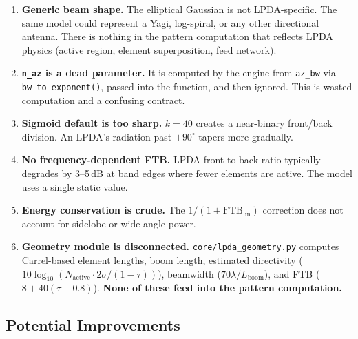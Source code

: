 \documentclass[11pt,a4paper]{article}
\begin{document}
\begin{enumerate}[nosep]
    \item \textbf{Generic beam shape.} The elliptical Gaussian is not LPDA-specific. The same model could represent a Yagi, log-spiral, or any other directional antenna. There is nothing in the pattern computation that reflects LPDA physics (active region, element superposition, feed network).
    \item \textbf{\texttt{n\_az} is a dead parameter.} It is computed by the engine from \texttt{az\_bw} via \texttt{bw\_to\_exponent()}, passed into the function, and then ignored. This is wasted computation and a confusing contract.
    \item \textbf{Sigmoid default is too sharp.} $k = 40$ creates a near-binary front/back division. An LPDA's radiation past $\pm 90^\circ$ tapers more gradually.
    \item \textbf{No frequency-dependent FTB.} LPDA front-to-back ratio typically degrades by 3--5\,dB at band edges where fewer elements are active. The model uses a single static value.
    \item \textbf{Energy conservation is crude.} The $1/(1 + \text{FTB}_\text{lin})$ correction does not account for sidelobe or wide-angle power.
    \item \textbf{Geometry module is disconnected.} \texttt{core/lpda\_geometry.py} computes Carrel-based element lengths, boom length, estimated directivity ($10 \log_{10}(N_\text{active} \cdot 2\sigma / (1-\tau))$), beamwidth ($70\lambda / L_\text{boom}$), and FTB ($8 + 40(\tau - 0.8)$). \textbf{None of these feed into the pattern computation.}
\end{enumerate}

\subsection{Potential Improvements}
\end{document}
